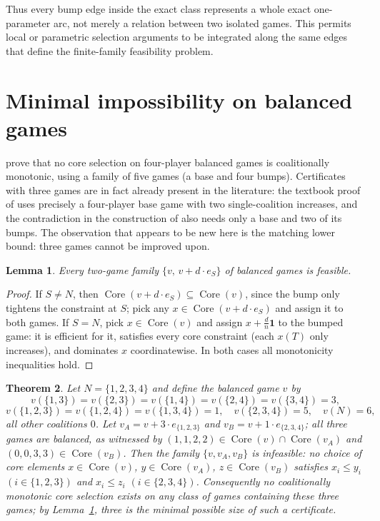 \documentclass[11pt]{article}
\newtheorem{theorem}{Theorem}[section]
\newtheorem{lemma}[theorem]{Lemma}
\newcommand{\core}{\operatorname{Core}}
\begin{document}
Thus every bump edge inside the exact class represents a whole exact
one-parameter arc, not merely a relation between two isolated games. This
permits local or parametric selection arguments to be integrated along the
same edges that define the finite-family feasibility problem.

\section{Minimal impossibility on balanced games}\label{sec:minimal}

\citet{HousmanClark98} prove that no core selection on four-player
balanced games is coalitionally monotonic, using a family of five games (a
base and four bumps). Certificates with three games are in fact already
present in the literature: the textbook proof of
\citet[Theorem~8.2.3]{PelegSudholter2003} uses precisely a four-player base
game with two single-coalition increases, and the contradiction in the
construction of \citet{Arin2013} also needs only a base and two of its
bumps. The observation that appears to be new here is the matching lower
bound: three games cannot be improved upon.

\begin{lemma}\label{lem:twogames}
Every two-game family $\{v,\,v+d\cdot e_S\}$ of balanced games is feasible.
\end{lemma}

\begin{proof}
If $S\neq N$, then $\core(v+d\cdot e_S)\subseteq\core(v)$, since the bump
only tightens the constraint at $S$; pick any $x\in\core(v+d\cdot e_S)$ and
assign it to both games. If $S=N$, pick $x\in\core(v)$ and assign
$x+\tfrac{d}{n}\mathbf{1}$ to the bumped game: it is efficient for it,
satisfies every core constraint (each $x(T)$ only increases), and dominates
$x$ coordinatewise. In both cases all monotonicity inequalities hold.
\end{proof}

\begin{theorem}\label{thm:threegame}
Let $N=\{1,2,3,4\}$ and define the balanced game $v$ by
\[
v(\{1,3\})=v(\{2,3\})=v(\{1,4\})=v(\{2,4\})=v(\{3,4\})=3,
\]
\[
v(\{1,2,3\})=v(\{1,2,4\})=v(\{1,3,4\})=1,\quad v(\{2,3,4\})=5,\quad v(N)=6,
\]
all other coalitions $0$. Let $v_A=v+3\cdot e_{\{1,2,3\}}$ and
$v_B=v+1\cdot e_{\{2,3,4\}}$; all three games are balanced, as witnessed by
$(1,1,2,2)\in\core(v)\cap\core(v_A)$ and $(0,0,3,3)\in\core(v_B)$. Then the
family $\{v,v_A,v_B\}$ is infeasible: no choice of core elements
$x\in\core(v)$, $y\in\core(v_A)$, $z\in\core(v_B)$ satisfies
$x_i\le y_i$ $(i\in\{1,2,3\})$ and $x_i\le z_i$ $(i\in\{2,3,4\})$.
Consequently no coalitionally monotonic core selection exists on any class
of games containing these three games; by Lemma~\ref{lem:twogames}, three
is the minimal possible size of such a certificate.
\end{theorem}
\end{document}
